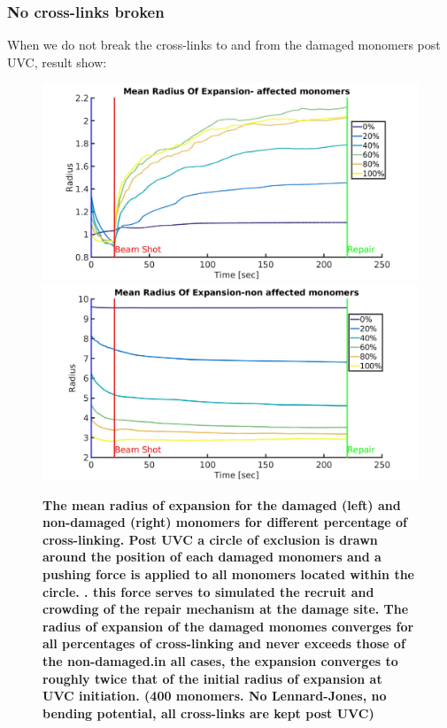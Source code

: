 \documentclass[12pt]{report}
\begin{document}
	 
	 \subsubsection{No cross-links broken}
	 When we do not break the cross-links to and from the damaged monomers post UVC, result show:
	 	 
	\begin{figure}[H]
	\includegraphics[width=0.5\linewidth, height=0.3\textheight]{Images/ExludeAroundDamagedMonomers/NoCrosslinksBroken/00/meanRadiusOfExpanssionAffected}
	\includegraphics[width=0.5\linewidth, height=0.3\textheight]{Images/ExludeAroundDamagedMonomers/NoCrosslinksBroken/00/meanRadiusOfExpanssionNonAffected}
	\caption{\tiny{\textbf{The mean radius of expansion for the damaged (left) and non-damaged (right) monomers for different percentage of cross-linking. Post UVC a circle of exclusion is drawn around the position of each damaged monomers and a pushing force is applied to all monomers located within the circle. . this force serves to simulated the recruit and crowding of the repair mechanism at the damage site. The radius of expansion of the damaged monomes converges for all percentages of cross-linking and never exceeds those of the non-damaged.in all cases, the expansion converges to roughly twice that of the initial radius of expansion at UVC initiation. (400 monomers. No Lennard-Jones, no bending potential, all cross-links are kept post UVC)}}}
	\label{fig:meanRadiusOfExpanssionAfectedVolumeOfExclusion}
	\end{figure}
	
\end{document}
